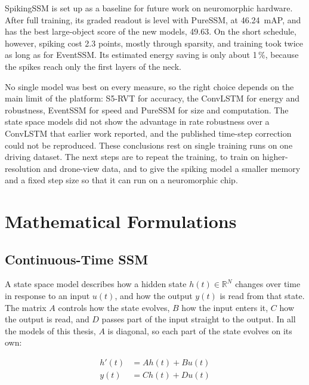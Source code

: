 \documentclass[11pt, a4paper]{report}
\newcounter{frontmatterpages}
\begin{document}
SpikingSSM is set up as a baseline for future work on neuromorphic hardware. After full training, its graded
readout is level with PureSSM, at 46.24~mAP, and has the best large-object score of the new models, 49.63. On
the short schedule, however, spiking cost 2.3 points, mostly through sparsity, and training took twice as long
as for EventSSM. Its estimated energy saving is only about 1\,\%, because the spikes reach only the first
layers of the neck.

No single model was best on every measure, so the right choice depends on the main limit of the platform:
S5-RVT for accuracy, the ConvLSTM for energy and robustness, EventSSM for speed and PureSSM for size and
computation. The state space models did not show the advantage in rate robustness over a ConvLSTM that earlier
work reported, and the published time-step correction could not be reproduced. These conclusions rest on
single training runs on one driving dataset. The next steps are to repeat the training, to train on
higher-resolution and drone-view data, and to give the spiking model a smaller memory and a fixed step size so
that it can run on a neuromorphic chip.

\clearpage
{}
\setcounter{page}{\value{frontmatterpages}}




\appendix

\chapter{Mathematical Formulations}
\label{app:maths}

\section{Continuous-Time SSM}
A state space model describes how a hidden state $h(t)\in\mathbb{R}^N$ changes over time in response to an
input $u(t)$, and how the output $y(t)$ is read from that state. The matrix $A$ controls how the state
evolves, $B$ how the input enters it, $C$ how the output is read, and $D$ passes part of the input straight
to the output. In all the models of this thesis, $A$ is diagonal, so each part of the state evolves on its
own:

\begin{align}
    h'(t) &= A h(t) + B u(t) \\
    y(t) &= C h(t) + D u(t)
\end{align}
\end{document}

